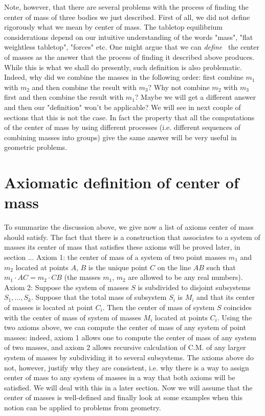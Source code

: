 Note, however, that there are several problems with the process of finding the center of mass of three bodies we just described. First of all, we did not define rigorously what we mean by center of mass. The tabletop equilibrium considerations depend on our intuitive understanding of the words "mass", "flat weightless tabletop", "forces" etc. One might argue that we can \textit{define} \ the center of masses as the answer that the process of finding it described above produces. While this is what we shall do presently, such definition is also problematic. Indeed, why did we combine the masses in the following order: first combine $m_1$ with $m_2$ and then combine the result with $m_3$? Why not combine $m_2$ with $m_3$ first and then combine the result with $m_1$? Maybe we will get a different answer and then our "definition" won't be applicable? We will see in next couple of sections that this is not the case. In fact the property that all the computations of the center of mass by using different processes (i.e. different sequences of combining masses into groups) give the same answer will be very useful in geometric problems.
\section{Axiomatic definition of center of mass}
To summarize the discussion above, we give now a list of axioms center of mass should satisfy. The fact that there is a construction that associates to a system of masses its center of mass that satisfies these axioms will be proved later, in section ...
Axiom 1: the center of mass of a system of two point masses $m_1$ and $m_2$ located at points $A$, $B$ is the unique point $C$ on the line $AB$ such that $m_1\cdot AC=m_2\cdot CB$ (the masses $m_1$, $m_2$ are allowed to be any real numbers).
Axiom 2: Suppose the system of masses $S$ is subdivided to disjoint subsystems $S_1,\ldots,S_k$. Suppose that the total mass of subsystem $S_i$ is $M_i$ and that its center of masses is located at point $C_i$. Then the center of mass of system $S$ coincides with the center of mass of system of masses $M_i$ located at points $C_i$.
Using the two axioms above, we can compute the center of mass of any system of point masses: indeed, axiom 1 allows one to compute the center of mass of any system of two masses, and axiom 2 allows recursive calculation of C.M. of any larger system of masses by subdividing it to several subsystems.
The axioms above do not, however, justify why they are consistent, i.e. why there is a way to assign center of mass to any system of masses in a way that both axioms will be satisfied. We will deal with this in a later section. Now we will assume that the center of masses is well-defined and finally look at some examples when this notion can be applied to problems from geometry.
